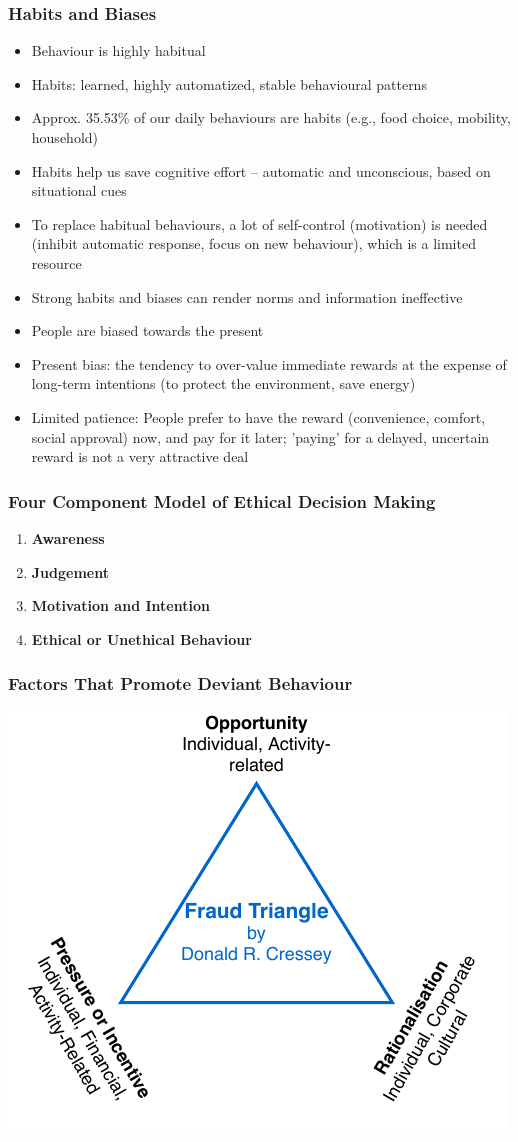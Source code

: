 \documentclass[11pt]{article}
\theoremstyle{definition}
\begin{document}
\subsubsection{Habits and Biases}
\begin{itemize}
	\item Behaviour is highly habitual
	\item Habits: learned, highly automatized, stable behavioural patterns
	\item Approx. 35.53\% of our daily behaviours are habits (e.g., food choice, mobility, household)
	\item Habits help us save cognitive effort -- automatic and unconscious, based on situational cues
	\item To replace habitual behaviours, a lot of self-control (motivation) is needed (inhibit automatic response, focus on new behaviour), which is a limited resource
	\item Strong habits and biases can render norms and information ineffective
	\item People are biased towards the present
	\item Present bias: the tendency to over-value immediate rewards at the expense of long-term intentions (to protect the environment, save energy)
	\item Limited patience: People prefer to have the reward (convenience, comfort, social approval) now, and pay for it later; 'paying' for a delayed, uncertain reward is not a very attractive deal
\end{itemize}

\subsubsection{Four Component Model of Ethical Decision Making}
\begin{enumerate}
	\item \textbf{Awareness}
	\item \textbf{Judgement}
	\item \textbf{Motivation and Intention}
	\item \textbf{Ethical or Unethical Behaviour}
\end{enumerate}

\subsubsection{Factors That Promote Deviant Behaviour}
\begin{center}
	\includegraphics[width=0.5\linewidth]{img/fraud_triangle}
\end{center}
\end{document}

